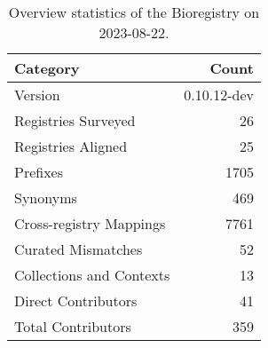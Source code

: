 \begin{table}
\caption{Overview statistics of the Bioregistry on 2023-08-22.}
\label{tab:bioregistry-summary}
\begin{tabular}{lr}
\toprule
Category & Count \\
\midrule
Version & 0.10.12-dev \\
Registries Surveyed & 26 \\
Registries Aligned & 25 \\
Prefixes & 1705 \\
Synonyms & 469 \\
Cross-registry Mappings & 7761 \\
Curated Mismatches & 52 \\
Collections and Contexts & 13 \\
Direct Contributors & 41 \\
Total Contributors & 359 \\
\bottomrule
\end{tabular}
\end{table}
